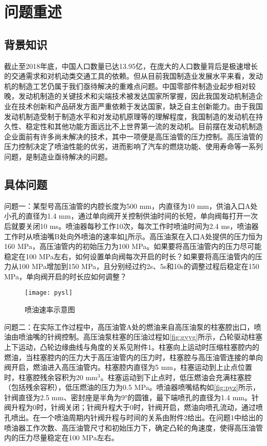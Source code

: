 \documentclass[withoutpreface,bwprint]{cumcmthesis} %
\begin{document}


\section{问题重述}
\subsection{背景知识}

截止至2018年底，中国人口数量已达13.95亿，在庞大的人口数量背后是极速增长的交通需求和对机动类交通工具的依赖。但从目前我国制造业发展水平来看，发动机的制造工艺仍属于我们亟待解决的重难点问题。中国零部件制造业起步相对较晚，发动机制造的关键技术和尖端技术被发达国家所掌握，因此我国发动机制造企业在技术创新和产品研发方面严重依赖于发达国家，缺乏自主创新能力。由于我国发动机制造受制于制造水平和对发动机原理等的理解程度，我国制造的发动机在持久性、稳定性和其他功能方面远比不上世界第一流的发动机。目前摆在发动机制造企业面前有许多尚未解决的技术，其中一项便是高压油管的压力控制。高压油管的压力控制决定了喷油性能的优劣，进而影响了汽车的燃烧功能、使用寿命等一系列问题，是制造业亟待解决的问题。

\subsection{具体问题}

问题一：某型号高压油管的内腔长度为500 mm，内直径为10 mm，供油入口A处小孔的直径为1.4 mm，通过单向阀开关控制供油时间的长短，单向阀每打开一次后就要关闭10 ms。喷油器每秒工作10次，每次工作时喷油时间为2.4 ms，喷油器工作时从喷油嘴B处向外喷油的速率如\cref{fig:pyslsyt}所示。高压油泵在入口A处提供的压力恒为160 MPa，高压油管内的初始压力为100 MPa。如果要将高压油管内的压力尽可能稳定在100 MPa左右，如何设置单向阀每次开启的时长？如果要将高压油管内的压力从100 MPa增加到150 MPa，且分别经过约2s、5s和10s的调整过程后稳定在150 MPa，单向阀开启的时长应如何调整？

\begin{figure}[!h]
	\centering
	\texttt{[image: pysl]}
	\caption{喷油速率示意图}
	\label{fig:pyslsyt}
\end{figure}

问题二：在实际工作过程中，高压油管A处的燃油来自高压油泵的柱塞腔出口，喷油由喷油嘴的针阀控制。高压油泵柱塞的压油过程如\cref{fig:gyyg}所示，凸轮驱动柱塞上下运动，凸轮边缘曲线与角度的关系见附件1。柱塞向上运动时压缩柱塞腔内的燃油，当柱塞腔内的压力大于高压油管内的压力时，柱塞腔与高压油管连接的单向阀开启，燃油进入高压油管内。柱塞腔内直径为5 mm，柱塞运动到上止点位置时，柱塞腔残余容积为20 mm$^3$。柱塞运动到下止点时，低压燃油会充满柱塞腔（包括残余容积），低压燃油的压力为0.5 MPa。喷油器喷嘴结构如\cref{fig:pyz}所示，针阀直径为2.5 mm、密封座是半角为9°的圆锥，最下端喷孔的直径为1.4 mm。针阀升程为0时，针阀关闭；针阀升程大于0时，针阀开启，燃油向喷孔流动，通过喷孔喷出。在一个喷油周期内针阀升程与时间的关系由附件2给出。在问题1中给出的喷油器工作次数、高压油管尺寸和初始压力下，确定凸轮的角速度，使得高压油管内的压力尽量稳定在100 MPa左右。
\end{document}
